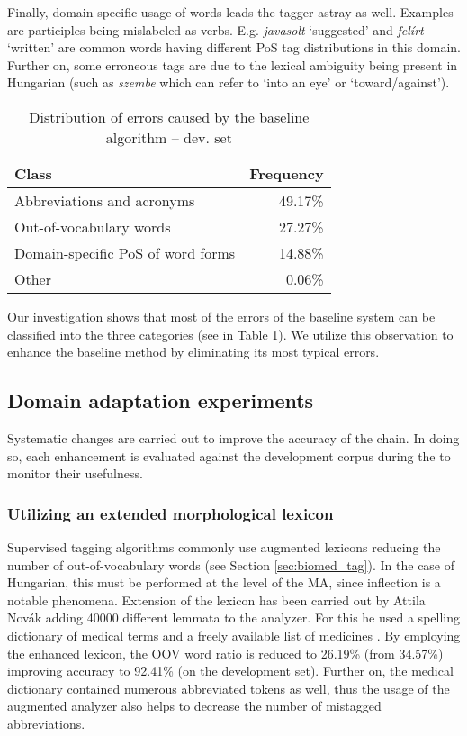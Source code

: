Finally, domain-specific usage of words leads the tagger astray as well. 
Examples are participles being mislabeled as verbs. 
E.g. \textit{javasolt} `suggested’  and  \textit{felírt} `written’ are common words having different PoS tag distributions in this domain. 
Further on, some erroneous tags are due to the lexical ambiguity being present in Hungarian (such as \textit{szembe} which can refer to `into an eye’ or `toward/against’). 

\begin{table}[h]
\centering
\caption{Distribution of errors caused by the baseline algorithm -- dev. set}
\label{tab:error_types}
\begin{tabular}{ l r } 
\hline
Class & Frequency  \\
\hline
Abbreviations and acronyms & 49.17\% \\
Out-of-vocabulary words & 27.27\% \\
Domain-specific PoS of word forms & 14.88\% \\
Other & 0.06\% \\
\hline
\end{tabular}
\end{table}

Our investigation shows that most of the errors of the baseline system can be classified into the three categories (see in Table \ref{tab:error_types}). 
We utilize this observation to enhance the baseline method by eliminating its most typical errors.

\subsection{Domain adaptation experiments}

Systematic changes are carried out to improve the accuracy of the chain. 
In doing so, each enhancement is evaluated against the development corpus during the to monitor their usefulness.

\subsubsection{Utilizing an extended morphological lexicon}
\label{sec:ma-extension}

Supervised tagging algorithms commonly use augmented lexicons reducing the number of out-of-vocabulary words (see Section \ref{sec:biomed_tag}). 
In the case of Hungarian, this must be performed at the level of the MA, since inflection is a notable phenomena. 
Extension of the lexicon has been carried out by Attila Novák \cite{Orosz2014} adding 40000 different lemmata to the analyzer. 
For this he used a spelling dictionary of medical terms \cite{Fabian1992} and a freely available list of medicines \cite{Foigazgatosag2012}.
By employing the enhanced lexicon, the OOV word ratio is reduced to 26.19\% (from 34.57\%) improving accuracy to 92.41\% (on the development set). 
Further on, the medical dictionary \cite{Fabian1992} contained numerous abbreviated tokens as well, thus the usage of the augmented analyzer also helps to decrease the number of mistagged abbreviations.

